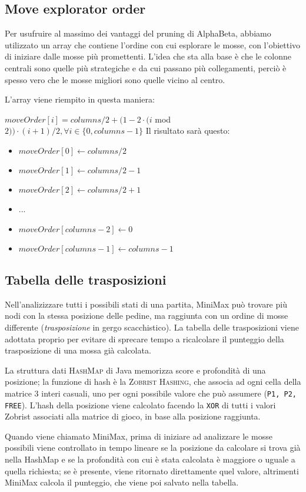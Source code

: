 \documentclass{article}
\begin{document}
\subsection{Move explorator order}
Per usufruire al massimo dei vantaggi del pruning di AlphaBeta, abbiamo utilizzato un array che contiene
l'ordine con cui esplorare le mosse, con l'obiettivo di iniziare dalle mosse più promettenti.
L'idea che sta alla base è che le colonne centrali sono quelle più strategiche e da cui passano
più collegamenti, perciò è spesso vero che le mosse migliori sono quelle vicino al centro.

L'array viene riempito in questa maniera:

$moveOrder[i] = columns / 2 + (1 - 2 \cdot (i $ mod $ 2)) \cdot (i + 1) / 2, \forall i \in \{0,columns-1\} $
Il risultato sarà questo: 
\begin{itemize}
  \item $moveOrder[0] \gets columns/2$
  \item $moveOrder[1] \gets columns/2 -1$
  \item $moveOrder[2] \gets columns/2 +1$
  \item ...
  \item $moveOrder[columns-2] \gets 0$
  \item $moveOrder[columns-1] \gets columns-1$
\end{itemize}

\subsection{Tabella delle trasposizioni}

Nell'analizizzare tutti i possibili stati di una partita, MiniMax può trovare più nodi con la stessa
posizione delle pedine, ma raggiunta con un ordine di mosse differente (\emph{trasposizione} 
in gergo scacchistico). La tabella delle trasposizioni viene adottata proprio per evitare di sprecare 
tempo a ricalcolare il punteggio della trasposizione di una mossa già calcolata.

La struttura dati \textsc{HashMap} di Java memorizza score e profondità di una posizione; la funzione di 
hash è la \textsc{Zobrist Hashing}, che associa ad ogni cella della matrice 3 interi casuali, uno per 
ogni possibile valore che può assumere (\verb!P1, P2, FREE!). L'hash della posizione viene calcolato 
facendo la \verb!XOR! di tutti i valori Zobrist associati alla matrice di gioco, in base alla 
posizione raggiunta.

Quando viene chiamato MiniMax, prima di iniziare ad analizzare le mosse possibili viene controllato
in tempo lineare se la posizione da calcolare si trova già nella HashMap e se la profondità con cui è
stata calcolata è maggiore o uguale a quella richiesta; se è presente, viene ritornato direttamente
quel valore, altrimenti MiniMax calcola il punteggio, che viene poi salvato nella tabella.
\end{document}
